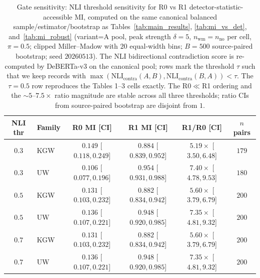 \begin{table}[t]
\centering
\small
\caption{Gate sensitivity: NLI threshold sensitivity for R0 vs R1
detector-statistic-accessible MI, computed on the same canonical balanced
sample/estimator/bootstrap as Tables~\ref{tab:main_results},
\ref{tab:mi_vs_det}, and~\ref{tab:mi_robust} (variant=A pool, peak strength
$\delta{=}5$, $n_{\text{wm}}{=}n_{\text{no}}$ per cell, $\pi{=}0.5$;
clipped Miller--Madow with $20$ equal-width bins; $B{=}500$ source-paired
bootstrap; seed $20260513$). The NLI bidirectional contradiction score is
re-computed by DeBERTa-v3 on the canonical pool; rows mark the threshold
$\tau$ such that we keep records with $\max(\text{NLI}_{\text{contra}}(A,B),
\text{NLI}_{\text{contra}}(B,A))<\tau$. The $\tau{=}0.5$ row reproduces the
Tables 1--3 cells exactly. The R0$\ll$R1 ordering and the $\sim\!5$--$7.5\times$
ratio magnitude are stable across all three thresholds; ratio CIs from
source-paired bootstrap are disjoint from $1$.}
\label{tab:gate_sens}
\setlength{\tabcolsep}{4pt}
\begin{tabular}{c l c c c c}
\toprule
NLI thr & Family & R0 MI [CI] & R1 MI [CI] & R1/R0 [CI] & $n$ pairs \\
\midrule
$0.3$ & KGW & $0.149$ [$0.118, 0.249$] & $0.884$ [$0.839, 0.952$] & $5.19\times$ [$3.50, 6.48$] & $179$ \\
$0.3$ & UW  & $0.106$ [$0.077, 0.196$] & $0.954$ [$0.931, 0.988$] & $7.40\times$ [$4.78, 9.53$] & $180$ \\
$0.5$ & KGW & $0.131$ [$0.103, 0.232$] & $0.882$ [$0.834, 0.942$] & $5.60\times$ [$3.79, 6.79$] & $200$ \\
$0.5$ & UW  & $0.136$ [$0.107, 0.221$] & $0.948$ [$0.920, 0.985$] & $7.35\times$ [$4.81, 9.32$] & $200$ \\
$0.7$ & KGW & $0.131$ [$0.103, 0.232$] & $0.882$ [$0.834, 0.942$] & $5.60\times$ [$3.79, 6.79$] & $200$ \\
$0.7$ & UW  & $0.136$ [$0.107, 0.221$] & $0.948$ [$0.920, 0.985$] & $7.35\times$ [$4.81, 9.32$] & $200$ \\
\bottomrule
\end{tabular}
\end{table}
